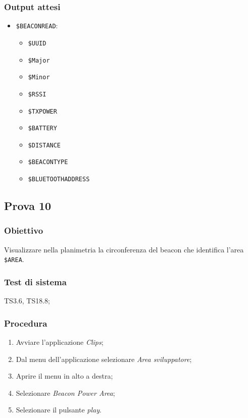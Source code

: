 \documentclass[../SperimentazioniPratiche.tex]{subfiles}
\begin{document}
	\subsubsection{Output attesi}
		\begin{itemize}
		\item \verb|$BEACONREAD|:
			\begin{itemize}
				\item \verb|$UUID|
			 	\item \verb|$Major|
			 	\item \verb|$Minor|
			 	\item \verb|$RSSI|
			 	\item \verb|$TXPOWER|
			 	\item \verb|$BATTERY|
			 	\item \verb|$DISTANCE|
			 	\item \verb|$BEACONTYPE|
			 	\item \verb|$BLUETOOTHADDRESS|
			\end{itemize}
			 
		\end{itemize}
		
\newpage
\subsection{Prova 10} %
\label{subsec:Prova10}

	\subsubsection{Obiettivo}
		Visualizzare nella planimetria la circonferenza del beacon che identifica l'area \verb|$AREA|.
	
	\subsubsection{Test di sistema}
		TS3.6, TS18.8;
	
	\subsubsection{Procedura}
		\begin{enumerate}
		\item Avviare l'applicazione \textit{Clips};
		\item Dal menu dell'applicazione selezionare \textit{Area sviluppatore};
		\item Aprire il menu in alto a destra;
		\item Selezionare \textit{Beacon Power Area};
		\item Selezionare il pulsante \textit{play}.
		\end{enumerate}
		
\end{document}
